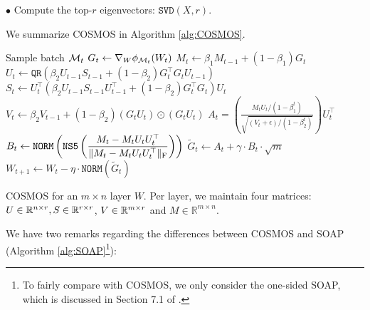 \vskip2pt
\noindent $\bullet$ Compute the top-$r$ eigenvectors: $\texttt{SVD}(X,r)$.

We summarize COSMOS in Algorithm \ref{alg:COSMOS}.

\begin{algorithm}[htb!]
	\begin{algorithmic}[1]
		\STATE Sample batch $\mathcal{M}_t$
		\STATE $G_t \gets \nabla_W \phi_{\mathcal{M}_t}(W_t)$
        \STATE $M_t \gets \beta_1M_{t-1}+(1-\beta_1)G_t$
        \STATE $U_t \gets \texttt{QR}(\beta_2U_{t-1}S_{t-1}+(1-\beta_2)G_t^\top G_tU_{t-1})$
        \STATE $S_t \gets U_t^\top(\beta_2 U_{t-1}S_{t-1}U_{t-1}^\top + (1-\beta_2)G_t^\top G_t)U_t$
		\STATE $V_t \gets \beta_2 V_{t-1} + (1-\beta_2) (G_tU_t) \odot (G_tU_t)$
		\STATE $\displaystyle A_t = \left(\frac{M_tU_t/(1-\beta_1^t)}{\sqrt{(V_t+\epsilon)/(1-\beta_2^t)}}\right)U_t^\top$
        \STATE $\displaystyle B_t \gets \texttt{NORM} \left(\texttt{NS5}\left(\frac{M_t-M_tU_tU_t^\top}{\|M_t-M_tU_tU_t^\top\|_{\rm F}}\right)\right)$
        \STATE $\displaystyle \tilde{G}_t \gets A_t + \gamma \cdot B_t\cdot\sqrt{m}$ 
		\STATE $\displaystyle W_{t+1} \gets W_{t} -\eta \cdot\texttt{NORM}(\tilde{G}_t)$
        \ENDFOR
	\end{algorithmic}
	\caption{COSMOS for an $m \times n$ layer $W$. Per layer, we maintain four matrices: $U \in \mathbb{R}^{n \times r}, S \in \mathbb{R}^{r \times r}$, $V\in\mathbb{R}^{m\times r}$ and $M \in \mathbb{R}^{m \times n}$.}
	\label{alg:COSMOS}
\end{algorithm}

We have two remarks regarding the differences between COSMOS and SOAP (Algorithm \ref{alg:SOAP}\footnote{To fairly compare with COSMOS, we only consider the one-sided SOAP, which is discussed in Section 7.1 of \citet{vyas2024soap}.}):

